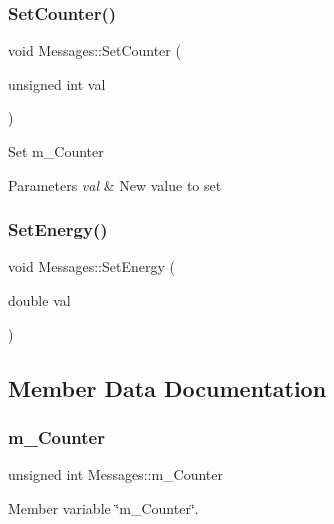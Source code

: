 \subsubsection{\texorpdfstring{Set\+Counter()}{SetCounter()}}
{\footnotesize\ttfamily void Messages\+::\+Set\+Counter (\begin{DoxyParamCaption}\item[{unsigned int}]{val }\end{DoxyParamCaption})\hspace{0.3cm}{\ttfamily [inline]}}

Set m\+\_\+\+Counter 
\begin{DoxyParams}{Parameters}
{\em val} & New value to set \\
\hline
\end{DoxyParams}
\mbox{\label{classMessages_a522996f78812e3a01e68214385db2cfd}} 
\subsubsection{\texorpdfstring{Set\+Energy()}{SetEnergy()}}
{\footnotesize\ttfamily void Messages\+::\+Set\+Energy (\begin{DoxyParamCaption}\item[{double}]{val }\end{DoxyParamCaption})\hspace{0.3cm}{\ttfamily [inline]}}



\subsection{Member Data Documentation}
\mbox{\label{classMessages_a43ed87c9f9c3ed6dee41b1e420eaf30f}} 
\subsubsection{\texorpdfstring{m\+\_\+\+Counter}{m\_Counter}}
{\footnotesize\ttfamily unsigned int Messages\+::m\+\_\+\+Counter\hspace{0.3cm}{\ttfamily [private]}}



Member variable \char`\"{}m\+\_\+\+Counter\char`\"{}. 

